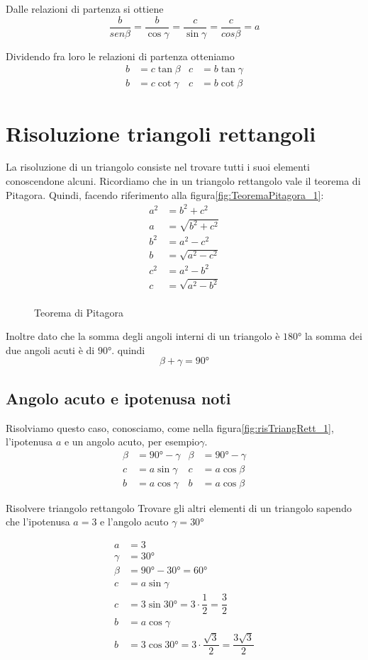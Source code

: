 \noindent Dalle relazioni di partenza si ottiene
\[\dfrac{b}{sen\beta}=\dfrac{b}{\cos\gamma}=\dfrac{c}{\sin\gamma}=\dfrac{c}{cos\beta}=a \]
\begin{teoremat}{}{}
Dividendo fra loro le relazioni di partenza otteniamo
\begin{align*}
b&=c\tan\beta&c&=b\tan\gamma\\
b&=c\cot\gamma&c&=b\cot\beta
\end{align*}
\end{teoremat}
\section{Risoluzione triangoli rettangoli}
La risoluzione di un triangolo consiste nel trovare tutti i suoi elementi conoscendone alcuni. Ricordiamo che in un triangolo rettangolo vale il teorema di Pitagora. Quindi, facendo riferimento alla figura\nobs\vref{fig:TeoremaPitagora_1}:
\begin{align*}
a^2&=b^2+c^2\\
a{}&=\sqrt{b^2+c^2}\\
b^2&=a^2-c^2\\
b{}&=\sqrt{a^2-c^2}\\
c^2&=a^2-b^2\\
c{}&=\sqrt{a^2-b^2}\\
\end{align*}
\begin{figure}
	\centering
	
	\caption{Teorema di Pitagora}
	\label{fig:TeoremaPitagora_1}
\end{figure}
Inoltre dato che la somma degli angoli interni di un triangolo è 
$\ang{180}$ la somma dei due angoli acuti è di $\ang{90}$. quindi
\[\beta+\gamma=\ang{90}\]
\subsection{Angolo acuto e ipotenusa noti}
Risolviamo questo caso, conosciamo, come nella figura\nobs\vref{fig:risTriangRett_1}, l'ipotenusa $a$ e un angolo acuto, per esempio\nobs$\gamma$.
\begin{align*}
\beta&=\ang{90}-\gamma&\beta&=\ang{90}-\gamma\\
c&=a\sin\gamma&c&=a\cos\beta\\
b&=a\cos\gamma&b&=a\cos\beta
\end{align*}
\begin{esempiot}{Risolvere triangolo rettangolo}{}
Trovare gli altri elementi di un triangolo sapendo che l'ipotenusa $a=3$ e l'angolo acuto $\gamma=\ang{30}$ 
\end{esempiot}
\begin{align*}
a&=3\\
\gamma&=\ang{30}\\
\beta&=\ang{90}-\ang{30}=\ang{60}\\
c&=a\sin\gamma\\
c&=3\sin\ang{30}=3\cdot\dfrac{1}{2}=\dfrac{3}{2}\\
b&=a\cos\gamma\\
b&=3\cos\ang{30}=3\cdot\dfrac{\sqrt{3}}{2}=\dfrac{3\sqrt{3}}{2}
\end{align*}
